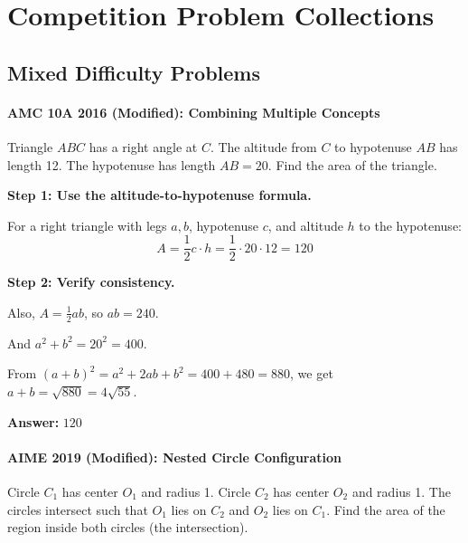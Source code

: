 ﻿\documentclass[12pt]{extarticle}
\begin{document}
\section{Competition Problem Collections}

\subsection{Mixed Difficulty Problems}

\paragraph{AMC 10A 2016 (Modified): Combining Multiple Concepts}

Triangle $ABC$ has a right angle at $C$. The altitude from $C$ to hypotenuse $AB$ has length 12. The hypotenuse has length $AB = 20$. Find the area of the triangle.

\begin{solutionbox}
\textbf{Step 1: Use the altitude-to-hypotenuse formula.}

For a right triangle with legs $a, b$, hypotenuse $c$, and altitude $h$ to the hypotenuse:
\[A = \frac{1}{2}c \cdot h = \frac{1}{2} \cdot 20 \cdot 12 = 120\]

\textbf{Step 2: Verify consistency.}

Also, $A = \frac{1}{2}ab$, so $ab = 240$.

And $a^2 + b^2 = 20^2 = 400$.

From $(a+b)^2 = a^2 + 2ab + b^2 = 400 + 480 = 880$, we get $a + b = \sqrt{880} = 4\sqrt{55}$.

\textbf{Answer:} $\boxed{120}$
\end{solutionbox}

\paragraph{AIME 2019 (Modified): Nested Circle Configuration}

Circle $C_1$ has center $O_1$ and radius 1. Circle $C_2$ has center $O_2$ and radius 1. The circles intersect such that $O_1$ lies on $C_2$ and $O_2$ lies on $C_1$. Find the area of the region inside both circles (the intersection).
\end{document}
